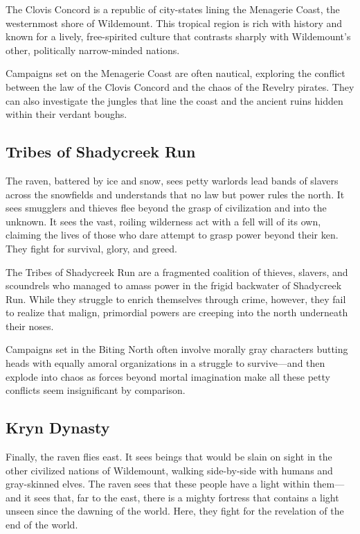 \documentclass[10pt,a4paper,twoside,bg=print,twocolumn,openany,nodeprecatedcode]{dndbook}
\begin{document}
The Clovis Concord is a republic of city-states lining the Menagerie Coast, the westernmost shore of Wildemount. This tropical region is rich with history and known for a lively, free-spirited culture that contrasts sharply with Wildemount's other, politically narrow-minded nations.

Campaigns set on the Menagerie Coast are often nautical, exploring the conflict between the law of the Clovis Concord and the chaos of the Revelry pirates. They can also investigate the jungles that line the coast and the ancient ruins hidden within their verdant boughs.

\subsection{Tribes of Shadycreek Run}
\begin{DndReadAloud}{}
The raven, battered by ice and snow, sees petty warlords lead bands of slavers across the snowfields and understands that no law but power rules the north. It sees smugglers and thieves flee beyond the grasp of civilization and into the unknown. It sees the vast, roiling wilderness act with a fell will of its own, claiming the lives of those who dare attempt to grasp power beyond their ken. They fight for survival, glory, and greed.

\end{DndReadAloud}

The Tribes of Shadycreek Run are a fragmented coalition of thieves, slavers, and scoundrels who managed to amass power in the frigid backwater of Shadycreek Run. While they struggle to enrich themselves through crime, however, they fail to realize that malign, primordial powers are creeping into the north underneath their noses.

Campaigns set in the Biting North often involve morally gray characters butting heads with equally amoral organizations in a struggle to survive—and then explode into chaos as forces beyond mortal imagination make all these petty conflicts seem insignificant by comparison.

\subsection{Kryn Dynasty}
\begin{DndReadAloud}{}
Finally, the raven flies east. It sees beings that would be slain on sight in the other civilized nations of Wildemount, walking side-by-side with humans and gray-skinned elves. The raven sees that these people have a light within them—and it sees that, far to the east, there is a mighty fortress that contains a light unseen since the dawning of the world. Here, they fight for the revelation of the end of the world.

\end{DndReadAloud}
\end{document}
